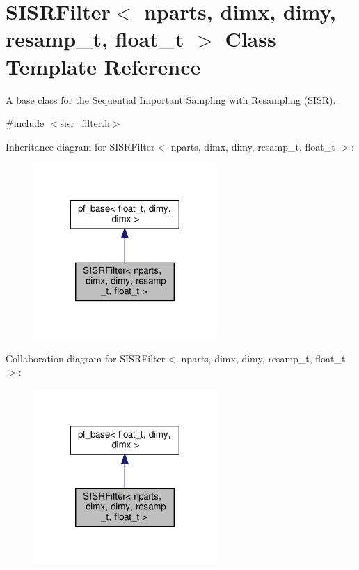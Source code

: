 \hypertarget{classSISRFilter}{}\section{S\+I\+S\+R\+Filter$<$ nparts, dimx, dimy, resamp\+\_\+t, float\+\_\+t $>$ Class Template Reference}
\label{classSISRFilter}


A base class for the Sequential Important Sampling with Resampling (S\+I\+SR).  




{\ttfamily \#include $<$sisr\+\_\+filter.\+h$>$}



Inheritance diagram for S\+I\+S\+R\+Filter$<$ nparts, dimx, dimy, resamp\+\_\+t, float\+\_\+t $>$\+:\nopagebreak
\begin{figure}[H]
\begin{center}
\leavevmode
\includegraphics[width=197pt]{classSISRFilter__inherit__graph}
\end{center}
\end{figure}


Collaboration diagram for S\+I\+S\+R\+Filter$<$ nparts, dimx, dimy, resamp\+\_\+t, float\+\_\+t $>$\+:\nopagebreak
\begin{figure}[H]
\begin{center}
\leavevmode
\includegraphics[width=197pt]{classSISRFilter__coll__graph}
\end{center}
\end{figure}
